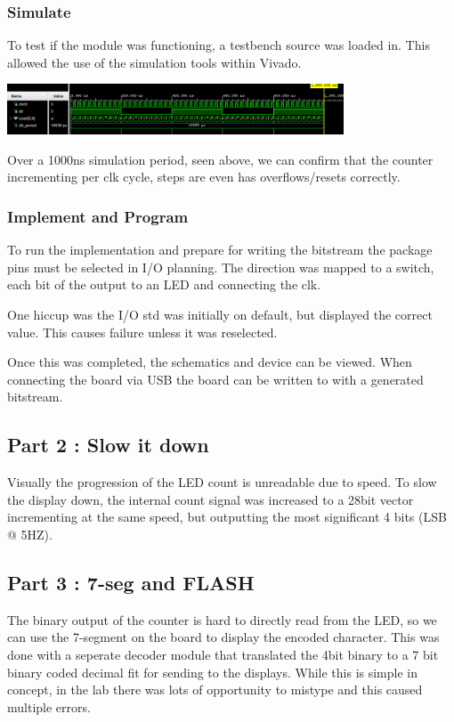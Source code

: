\documentclass[11pt]{article}
\begin{document}
\begin{preview}
        \subsubsection*{Simulate}
        To test if the module was functioning, a testbench source was loaded in. This allowed the use of the simulation tools within Vivado.
        \begin{center}
                \includegraphics[width=0.75\textwidth]{resource/sim1.PNG}
        \end{center}
        Over a 1000ns simulation period, seen above, we can confirm that the counter incrementing per clk cycle, steps are even has overflows/resets correctly.
        \subsubsection*{Implement and Program}
        To run the implementation and prepare for writing the bitstream the package pins must be selected in I/O planning. The direction was mapped to a switch, each bit of the output to an LED and connecting the clk.

        One hiccup was the I/O std was initially on default, but displayed the correct value. This causes failure unless it was reselected.

        Once this was completed, the schematics and device can be viewed. When connecting the board via USB the board can be written to with a generated bitstream.

        \subsection{Part 2 : Slow it down}
        Visually the progression of the LED count is unreadable due to speed. To slow the display down, the internal count signal was increased to a 28bit vector incrementing at the same speed, but outputting the most significant 4 bits (LSB @ 5HZ).

        \subsection{Part 3 : 7-seg and FLASH}
        The binary output of the counter is hard to directly read from the LED, so we can use the 7-segment on the board to display the encoded character. This was done with a seperate decoder module that translated the 4bit binary to a 7 bit binary coded decimal fit for sending to the displays. While this is simple in concept, in the lab there was lots of opportunity to mistype and this caused multiple errors. 



\end{preview}
\end{document}
